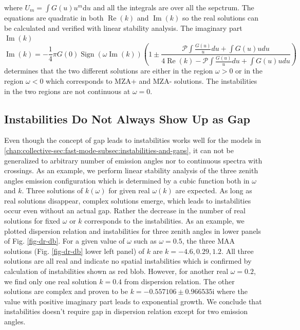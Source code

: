 where $U_m = \int G(u) u^m \mathrm du$ and all the integrals are over all the sepctrum. The equations are quadratic in both $\operatorname{Re}(k)$ and $\operatorname{Im}(k)$ so the real solutions can be calculated and verified with linear stability analysis. The imaginary part $\operatorname{Im}(k)$
\begin{equation}
   \operatorname{Im}(k) = - \frac{1}{4} \pi G(0) \operatorname{Sign}(\omega \operatorname{Im}(k) ) \left(  1 \pm \frac{ \mathscr P \int \frac{G(u)}{u} du + \int G(u) u du }{ 4 \operatorname{Re}(k) - \mathscr P \int \frac{G(u)}{u} du + \int G(u) u du }  \right)
\end{equation}
determines that the two different solutions are either in the region $\omega>0$ or in the region $\omega<0$ which corresponds to MZA+ and MZA- solutions. The instabilities in the two regions are not continuous at $\omega=0$.



\subsection{\label{chap:collective-sec:fast-mode-subsec:instability-to-gap}Instabilities Do Not Always Show Up as Gap}

Even though the concept of gap leads to instabilities works well for the models in \ref{chap:collective-sec:fast-mode-subsec:instabilities-and-gaps}, it can not be generalized to arbitrary number of emission angles nor to continuous spectra with crossings. As an example, we perform linear stability analysis of the three zenith angles emission configuration which is determined by a cubic function both in $\omega$ and $k$. Three solutions of $k(\omega)$ for given real $\omega(k)$  are expected. As long as real solutions disappear, complex solutions emerge, which leads to instabilities occur even without an actual gap. Rather the decrease in the number of real solutions for fixed $\omega$ or $k$ corresponds to the instabilities. As an example, we plotted dispersion relation and instabilities for three zenith angles in lower panels of Fig. \ref{fig-dr-db}. For a given value of $\omega$ such as $\omega= 0.5$, the three MAA solutions (Fig. \ref{fig-dr-db} lower left panel) of $k$ are $k=-4.6, 0.29, 1.2$. All three solutions are all real and indicate no spatial instabilities which is confirmed by calculation of instabilities shown as red blob. However, for another real $\omega = 0.2$, we find only one real solution $k=0.4$ from dispersion relation. The other solutions are complex and proven to be $k = -0.557106\pm 0.966535\mathrm i$ where the value with positive imaginary part leads to exponential growth. We conclude that instabilities doesn't require gap in dispersion relation except for two emission angles.


